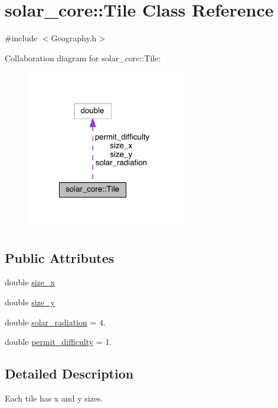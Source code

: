 \hypertarget{classsolar__core_1_1_tile}{}\section{solar\+\_\+core\+:\+:Tile Class Reference}
\label{classsolar__core_1_1_tile}


{\ttfamily \#include $<$Geography.\+h$>$}



Collaboration diagram for solar\+\_\+core\+:\+:Tile\+:
\nopagebreak
\begin{figure}[H]
\begin{center}
\leavevmode
\includegraphics[width=195pt]{classsolar__core_1_1_tile__coll__graph}
\end{center}
\end{figure}
\subsection*{Public Attributes}
\begin{DoxyCompactItemize}
\item 
double \hyperlink{classsolar__core_1_1_tile_ae8615b87d6d0c614de01b497fa63c27b}{size\+\_\+x}
\item 
double \hyperlink{classsolar__core_1_1_tile_a698ac57539f58ed4e0a54b3135be6fb9}{size\+\_\+y}
\item 
double \hyperlink{classsolar__core_1_1_tile_aae222e441b1dfe68cc6b78bb946f5e02}{solar\+\_\+radiation} = 4.
\item 
double \hyperlink{classsolar__core_1_1_tile_ac4cdbb55f06b95bd8c4a11a25d0b6635}{permit\+\_\+difficulty} = 1.
\end{DoxyCompactItemize}


\subsection{Detailed Description}
Each tile has x and y sizes. 

